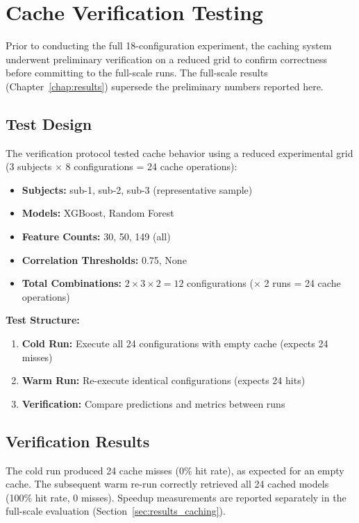 \section{Cache Verification Testing}
\label{sec:verification}

Prior to conducting the full 18-configuration experiment, the caching system
underwent preliminary verification on a reduced grid to confirm correctness
before committing to the full-scale runs. The full-scale results
(Chapter~\ref{chap:results}) supersede the preliminary numbers reported here.

\subsection{Test Design}

The verification protocol tested cache behavior using a reduced experimental
grid (3 subjects $\times$ 8 configurations = 24 cache operations):

\begin{itemize}
\item \textbf{Subjects:} sub-1, sub-2, sub-3 (representative sample)
\item \textbf{Models:} XGBoost, Random Forest
\item \textbf{Feature Counts:} 30, 50, 149 (all)
\item \textbf{Correlation Thresholds:} 0.75, None
\item \textbf{Total Combinations:} $2 \times 3 \times 2 = 12$ configurations
 ($\times$ 2 runs = 24 cache operations)
\end{itemize}

\textbf{Test Structure:}
\begin{enumerate}
\item \textbf{Cold Run:} Execute all 24 configurations with empty cache (expects 24 misses)
\item \textbf{Warm Run:} Re-execute identical configurations (expects 24 hits)
\item \textbf{Verification:} Compare predictions and metrics between runs
\end{enumerate}

\subsection{Verification Results}

The cold run produced 24 cache misses (0\% hit rate), as expected for an empty cache. The subsequent warm re-run correctly retrieved all 24 cached models (100\% hit rate, 0 misses). Speedup measurements are reported separately in the full-scale evaluation (Section~\ref{sec:results_caching}).

